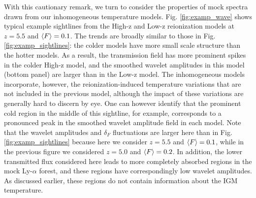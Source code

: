 With this cautionary remark, we turn to consider the properties of mock spectra drawn from our inhomogeneous temperature models.
Fig. \ref{fig:examp_wave} shows typical example sightlines from the High-z and Low-z reionization models at $z=5.5$ and $\langle F \rangle=0.1$. The trends
are broadly similar to those 
in Fig. \ref{fig:examp_sightlines}: the colder models have more small scale structure than the hotter models. As a result, the transmission
field has more prominent spikes in the colder High-z model, and the smoothed wavelet amplitudes in this model (bottom panel) are 
larger than in the Low-z model. 
The inhomogeneous
models incorporate, however, the reionization-induced temperature variations that are not included in the previous model, although the impact of
these variations are generally hard to discern by eye. One can however identify that the prominent cold region in the middle of this sightline,
for example, corresponds to a pronounced peak in the smoothed wavelet amplitude field in each model. Note that the wavelet amplitudes and $\delta_F$
fluctuations are larger here than in Fig. \ref{fig:examp_sightlines} because here we consider $z=5.5$ and $\langle F \rangle=0.1$, while in the previous figure
we considered $z=5.0$ and $\langle F \rangle=0.2$. In addition, the lower transmitted flux considered here leads to more completely absorbed
regions in the mock Ly-$\alpha$ forest, and these regions have correspondingly low wavelet amplitudes. As discussed earlier, these regions do not
contain information about the IGM temperature. 


